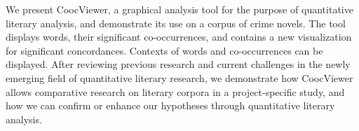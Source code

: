 We present CoocViewer, a graphical analysis tool for the purpose of quantitative literary analysis, and demonstrate its use on a corpus of crime
 novels. The tool displays words, their significant co-occurrences, and contains
 a new visualization for significant concordances. Contexts of words and
 co-occurrences
 can be displayed. After reviewing previous research and current challenges in
 the newly emerging field of quantitative literary research, we demonstrate how
 CoocViewer allows comparative research on literary corpora in a
 project-specific study, and how we can confirm or enhance our hypotheses
 through quantitative literary analysis.

